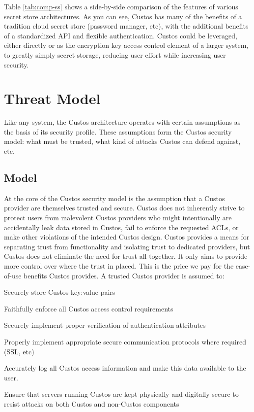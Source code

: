 Table \ref{tab:comp-ss} shows a side-by-side comparison of the
features of various secret store architectures. As you can see, Custos
has many of the benefits of a tradition cloud secret store (password
manager, etc), with the additional benefits of a standardized API and
flexible authentication. Custos could be leveraged, either directly or
as the encryption key access control element of a larger system, to
greatly simply secret storage, reducing user effort while increasing
user security.

\section{Threat Model}

Like any system, the Custos architecture operates with certain
assumptions as the basis of its security profile. These assumptions
form the Custos security model: what must be trusted, what kind of
attacks Custos can defend against, etc.

\subsection{Model}

At the core of the Custos security model is the assumption that a
Custos provider are themselves trusted and secure. Custos does not
inherently strive to protect users from malevolent Custos providers
who might intentionally are accidentally leak data stored in Custos, fail
to enforce the requested ACLs, or make other violations of the intended
Custos design. Custos provides a means for separating trust from
functionality and isolating trust to dedicated providers, but Custos
does not eliminate the need for trust all together. It only aims to
provide more control over where the trust in placed. This is the price
we pay for the ease-of-use benefits Custos provides. A trusted Custos
provider is assumed to:

\begin{packed_item}
\item Securely store Custos key:value pairs
\item Faithfully enforce all Custos access control requirements
\item Securely implement proper verification of authentication attributes
\item Properly implement appropriate secure communication protocols where
  required (SSL, etc)
\item Accurately log all Custos access information and make this data
  available to the user.
\item Ensure that servers running Custos are kept physically and
  digitally secure to resist attacks on both Custos and non-Custos
  components
\end{packed_item}

